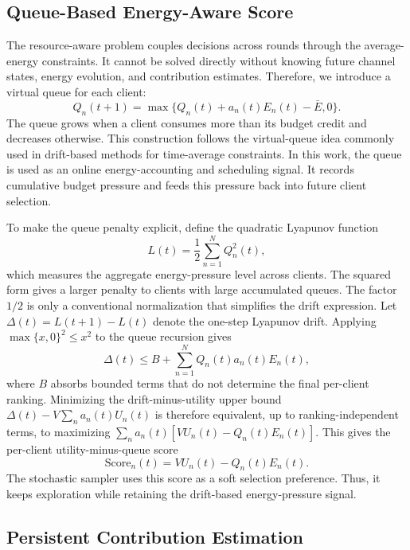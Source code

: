 \documentclass[journal]{IEEEtran}
\begin{document}
\subsection{Queue-Based Energy-Aware Score}

The resource-aware problem couples decisions across rounds through the average-energy constraints. It cannot be solved directly without knowing future channel states, energy evolution, and contribution estimates. Therefore, we introduce a virtual queue for each client:
\begin{equation}
\label{eq:virtual_queue}
Q_n(t+1)=\max\{Q_n(t)+a_n(t)E_n(t)-\bar{E},0\}.
\end{equation}
The queue grows when a client consumes more than its budget credit and decreases otherwise. This construction follows the virtual-queue idea commonly used in drift-based methods for time-average constraints. In this work, the queue is used as an online energy-accounting and scheduling signal. It records cumulative budget pressure and feeds this pressure back into future client selection.

To make the queue penalty explicit, define the quadratic Lyapunov function
\begin{equation}
L(t)=\frac{1}{2}\sum_{n=1}^{N}Q_n^2(t),
\end{equation}
which measures the aggregate energy-pressure level across clients. The squared form gives a larger penalty to clients with large accumulated queues. The factor $1/2$ is only a conventional normalization that simplifies the drift expression. Let $\Delta(t)=L(t+1)-L(t)$ denote the one-step Lyapunov drift. Applying $\max\{x,0\}^2\leq x^2$ to the queue recursion gives
\begin{equation}
\Delta(t)\leq B+\sum_{n=1}^{N}Q_n(t)a_n(t)E_n(t),
\end{equation}
where $B$ absorbs bounded terms that do not determine the final per-client ranking. Minimizing the drift-minus-utility upper bound $\Delta(t)-V\sum_n a_n(t)U_n(t)$ is therefore equivalent, up to ranking-independent terms, to maximizing $\sum_n a_n(t)[VU_n(t)-Q_n(t)E_n(t)]$. This gives the per-client utility-minus-queue score
\begin{equation}
\label{eq:queue_score}
\text{Score}_n(t)=V U_n(t)-Q_n(t)E_n(t).
\end{equation}
The stochastic sampler uses this score as a soft selection preference. Thus, it keeps exploration while retaining the drift-based energy-pressure signal.

\subsection{Persistent Contribution Estimation}
\end{document}
